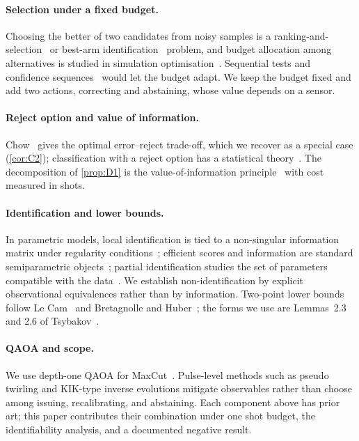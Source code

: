 \documentclass[10pt,twocolumn]{article}
\theoremstyle{definition}
\theoremstyle{remark}
\begin{document}
\paragraph{Selection under a fixed budget.} Choosing the better of two candidates from noisy samples is a ranking-and-selection~\cite{bechhofer1954,kimnelson2006} or best-arm identification~\cite{kaufmann2016,garivier2016} problem, and budget allocation among alternatives is studied in simulation optimisation~\cite{chen2000ocba}. Sequential tests and confidence sequences~\cite{wald1945,howard2021} would let the budget adapt. We keep the budget fixed and add two actions, correcting and abstaining, whose value depends on a sensor.

\paragraph{Reject option and value of information.} Chow~\cite{chow1970} gives the optimal error--reject trade-off, which we recover as a special case (\cref{cor:C2}); classification with a reject option has a statistical theory~\cite{herbei2006}. The decomposition of \cref{prop:D1} is the value-of-information principle~\cite{howard1966voi} with cost measured in shots.

\paragraph{Identification and lower bounds.} In parametric models, local identification is tied to a non-singular information matrix under regularity conditions~\cite{rothenberg1971}; efficient scores and information are standard semiparametric objects~\cite{vandervaart1998}; partial identification studies the set of parameters compatible with the data~\cite{tamer2010,imbens2004}. We establish non-identification by explicit observational equivalences rather than by information. Two-point lower bounds follow Le Cam~\cite{lecam1973} and Bretagnolle and Huber~\cite{bretagnolle1979}; the forms we use are Lemmas~2.3 and 2.6 of Tsybakov~\cite{tsybakov2009}.

\paragraph{QAOA and scope.} We use depth-one QAOA for MaxCut~\cite{farhi2014,zhou2020qaoa}. Pulse-level methods such as pseudo twirling and KIK-type inverse evolutions mitigate observables rather than choose among issuing, recalibrating, and abstaining. Each component above has prior art; this paper contributes their combination under one shot budget, the identifiability analysis, and a documented negative result.
\end{document}
